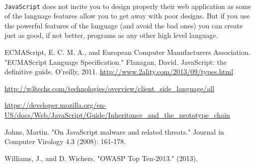 \documentclass{report}
\begin{document}
\paragraph{}
\texttt{JavaScript} does not incite you to design properly their web application as some of the language features allow you to get away with poor designs. But if you use the powerful features of the language (and avoid the bad ones) you can create just as good, if not better, programs as any other high level language.
\begin{thebibliography}{99}
ECMAScript, E. C. M. A., and European Computer Manufacturers Association. "ECMAScript Language Specification."
Flanagan, David. JavaScript: the definitive guide. O'reilly, 2011.
    \url{http://www.2ality.com/2013/09/types.html}

\url{http://w3techs.com/technologies/overview/client_side_language/all}

\url{https://developer.mozilla.org/en-US/docs/Web/JavaScript/Guide/Inheritance\_and\_the\_prototype\_chain}

Johns, Martin. "On JavaScript malware and related threats." Journal in Computer Virology 4.3 (2008): 161-178.



Williams, J., and D. Wichers. "OWASP Top Ten-2013." (2013).
\end{thebibliography}
\end{document}
